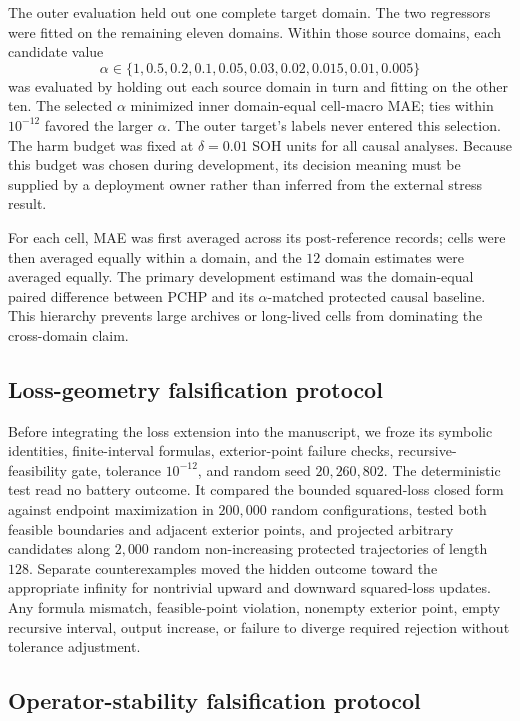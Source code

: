 \documentclass[11pt]{article}
\begin{document}
The outer evaluation held out one complete target domain. The two regressors were fitted on the remaining eleven domains. Within those source domains, each candidate value
\[
\alpha\in\{1,0.5,0.2,0.1,0.05,0.03,0.02,0.015,0.01,0.005\}
\]
was evaluated by holding out each source domain in turn and fitting on the other ten. The selected $\alpha$ minimized inner domain-equal cell-macro MAE; ties within $10^{-12}$ favored the larger $\alpha$. The outer target's labels never entered this selection. The harm budget was fixed at $\delta=0.01$ SOH units for all causal analyses. Because this budget was chosen during development, its decision meaning must be supplied by a deployment owner rather than inferred from the external stress result.

For each cell, MAE was first averaged across its post-reference records; cells were then averaged equally within a domain, and the $12$ domain estimates were averaged equally. The primary development estimand was the domain-equal paired difference between PCHP and its $\alpha$-matched protected causal baseline. This hierarchy prevents large archives or long-lived cells from dominating the cross-domain claim.

\subsection{Loss-geometry falsification protocol}

Before integrating the loss extension into the manuscript, we froze its symbolic identities, finite-interval formulas, exterior-point failure checks, recursive-feasibility gate, tolerance $10^{-12}$, and random seed $20{,}260{,}802$. The deterministic test read no battery outcome. It compared the bounded squared-loss closed form against endpoint maximization in $200{,}000$ random configurations, tested both feasible boundaries and adjacent exterior points, and projected arbitrary candidates along $2{,}000$ random non-increasing protected trajectories of length $128$. Separate counterexamples moved the hidden outcome toward the appropriate infinity for nontrivial upward and downward squared-loss updates. Any formula mismatch, feasible-point violation, nonempty exterior point, empty recursive interval, output increase, or failure to diverge required rejection without tolerance adjustment.

\subsection{Operator-stability falsification protocol}
\end{document}
